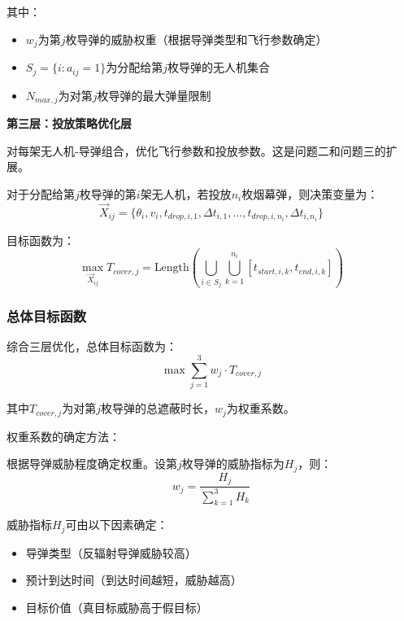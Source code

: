 \documentclass[12pt,a4paper]{article}
\begin{document}
\indent 其中：
\begin{itemize}
\item $w_j$为第$j$枚导弹的威胁权重（根据导弹类型和飞行参数确定）
\item $S_j = \{i : a_{ij} = 1\}$为分配给第$j$枚导弹的无人机集合
\item $N_{max,j}$为对第$j$枚导弹的最大弹量限制
\end{itemize}

\noindent\textbf{第三层：投放策略优化层}

\indent 对每架无人机-导弹组合，优化飞行参数和投放参数。这是问题二和问题三的扩展。

\indent 对于分配给第$j$枚导弹的第$i$架无人机，若投放$n_i$枚烟幕弹，则决策变量为：
\begin{equation}
\vec{X}_{ij} = \{\theta_i, v_i, t_{drop,i,1}, \Delta t_{i,1}, \ldots, t_{drop,i,n_i}, \Delta t_{i,n_i}\}
\end{equation}

\indent 目标函数为：
\begin{equation}
\max_{\vec{X}_{ij}} T_{cover,j} = \text{Length}\left(\bigcup_{i \in S_j} \bigcup_{k=1}^{n_i} [t_{start,i,k}, t_{end,i,k}]\right)
\end{equation}

\subsubsection{总体目标函数}

\indent 综合三层优化，总体目标函数为：
\begin{equation}
\max \sum_{j=1}^{3} w_j \cdot T_{cover,j}
\end{equation}

\indent 其中$T_{cover,j}$为对第$j$枚导弹的总遮蔽时长，$w_j$为权重系数。

\indent 权重系数的确定方法：

\indent 根据导弹威胁程度确定权重。设第$j$枚导弹的威胁指标为$H_j$，则：
\begin{equation}
w_j = \frac{H_j}{\sum_{k=1}^{3} H_k}
\end{equation}

\indent 威胁指标$H_j$可由以下因素确定：
\begin{itemize}
\item 导弹类型（反辐射导弹威胁较高）
\item 预计到达时间（到达时间越短，威胁越高）
\item 目标价值（真目标威胁高于假目标）
\end{itemize}
\end{document}
